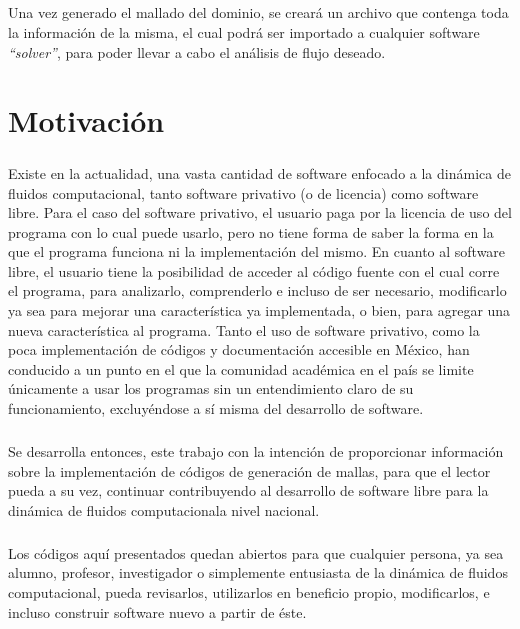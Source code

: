 \documentclass[letterpaper, openright, 12pt]{book}
\begin{document}
	\paragraph*{}
		Una vez generado el mallado del dominio, se creará un archivo que contenga toda la información de la misma, el cual podrá ser importado a cualquier software \textit{``solver''}, para poder llevar a cabo el análisis de flujo deseado.



	
	\chapter*{Motivación}
	\paragraph*{}
		Existe en la actualidad, una vasta cantidad de software enfocado a la dinámica de fluidos computacional, tanto software privativo (o de licencia) como software libre. Para el caso del software privativo, el usuario paga por la licencia de uso del programa con lo cual puede usarlo, pero no tiene forma de saber la forma en la que el programa funciona ni la implementación del mismo. En cuanto al software libre, el usuario tiene la posibilidad de acceder al código fuente con el cual corre el programa, para analizarlo, comprenderlo e incluso de ser necesario, modificarlo ya sea para mejorar una característica ya implementada, o bien, para agregar una nueva característica al programa. Tanto el uso de software privativo, como la poca implementación de códigos y documentación accesible en México, han conducido a un punto en el que la comunidad académica en el país se limite únicamente a usar los programas sin un entendimiento claro de su funcionamiento, excluyéndose a sí misma del desarrollo de software.
	\paragraph*{}
		Se desarrolla entonces, este trabajo con la intención de proporcionar información sobre la implementación de códigos de generación de mallas, para que el lector pueda a su vez, continuar contribuyendo al desarrollo de software libre para la dinámica de fluidos computacionala nivel nacional. 
		
	\paragraph*{}
		Los códigos aquí presentados quedan abiertos para que cualquier persona, ya sea alumno, profesor, investigador o  simplemente entusiasta de la dinámica de fluidos computacional, pueda revisarlos, utilizarlos en beneficio propio, modificarlos, e incluso construir software nuevo a partir de éste.
\end{document}
